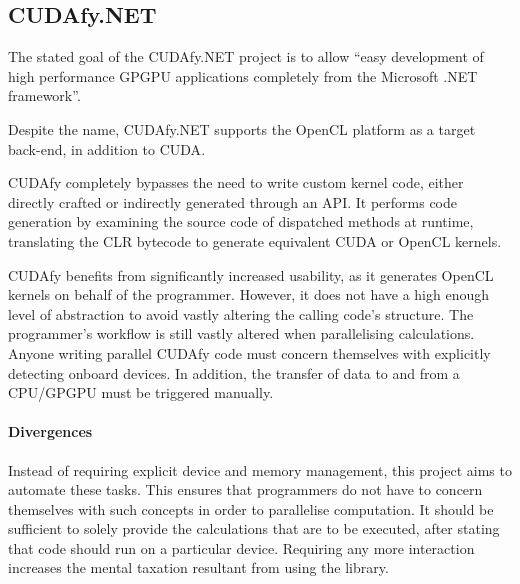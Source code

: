 \subsection{CUDAfy.NET}
The stated goal of the CUDAfy.NET\cite{cudafy} project is to allow ``easy development of high performance \ac{GPGPU} applications completely from the Microsoft .NET framework''.

Despite the name, CUDAfy.NET supports the \ac{OpenCL} platform as a target back-end, in addition to \ac{CUDA}.

CUDAfy completely bypasses the need to write custom kernel code, either directly crafted or indirectly generated through an API. It performs code generation by examining the source code of dispatched methods at runtime, translating the \ac{CLR} bytecode to generate equivalent \ac{CUDA} or \ac{OpenCL} kernels.

CUDAfy benefits from significantly increased usability, as it generates \ac{OpenCL} kernels on behalf of the programmer. However, it does not have a high enough level of abstraction to avoid vastly altering the calling code's structure. The programmer's workflow is still vastly altered when parallelising calculations. Anyone writing parallel CUDAfy code must concern themselves with explicitly detecting onboard devices. In addition, the transfer of data to and from a \ac{CPU}/\ac{GPGPU} must be triggered manually.

\paragraph*{Divergences}
Instead of requiring explicit device and memory management, this project aims to automate these tasks. This ensures that programmers do not have to concern themselves with such concepts in order to parallelise computation. It should be sufficient to solely provide the calculations that are to be executed, after stating that code should run on a particular device. Requiring any more interaction increases the mental taxation resultant from using the library.
